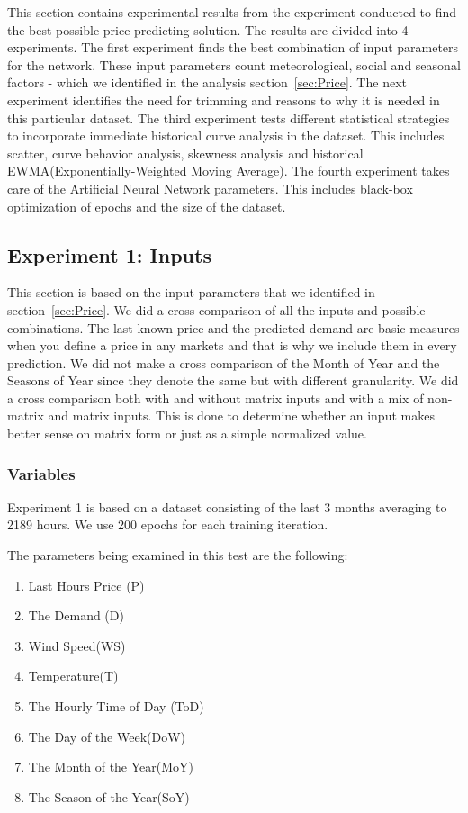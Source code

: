 This section contains experimental results from the experiment conducted to find the best possible price predicting solution. The results are divided into 4 experiments. The first experiment finds the best combination of input parameters for the network. These input parameters count meteorological, social and seasonal factors - which we identified in the analysis section~\ref{sec:Price}. The next experiment identifies the need for trimming and reasons to why it is needed in this particular dataset. The third experiment tests different statistical strategies to incorporate immediate historical curve analysis in the dataset. This includes scatter, curve behavior analysis, skewness analysis and historical EWMA(Exponentially-Weighted Moving Average). The fourth experiment takes care of the Artificial Neural Network parameters. This includes black-box optimization of epochs and the size of the dataset.

\subsection{Experiment 1: Inputs}
This section is based on the input parameters that we identified in section~\ref{sec:Price}. We did a cross comparison of all the inputs and possible combinations. The last known price and the predicted demand are basic measures when you define a price in any markets and that is why we include them in every prediction. We did not make a cross comparison of the Month of Year and the Seasons of Year since they denote the same but with different granularity. We did a cross comparison both with and without matrix inputs and with a mix of non-matrix and matrix inputs. This is done to determine whether an input makes better sense on matrix form or just as a simple normalized value. 

\subsubsection{Variables}
Experiment 1 is based on a dataset consisting of the last 3 months averaging to 2189 hours. We use 200 epochs for each training iteration.

The parameters being examined in this test are the following:
\begin{enumerate}
	\item Last Hours Price (P)
	\item The Demand (D)
	\item Wind Speed(WS)
	\item Temperature(T)
	\item The Hourly Time of Day (ToD)
	\item The Day of the Week(DoW)
	\item The Month of the Year(MoY)
	\item The Season of the Year(SoY)
\end{enumerate}


